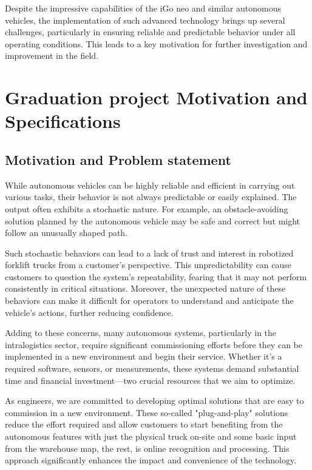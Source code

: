 Despite the impressive capabilities of the iGo neo and similar autonomous vehicles, the implementation 
of such advanced technology brings up several challenges, particularly in ensuring reliable and predictable 
behavior under all operating conditions. This leads to a key motivation for further investigation and improvement 
in the field.

\section{Graduation project Motivation and Specifications}

\subsection{Motivation and Problem statement}

While autonomous vehicles can be highly reliable and efficient in carrying out various 
tasks, their behavior is not always predictable or easily explained. The output often 
exhibits a stochastic nature. For example, an obstacle-avoiding solution planned by 
the autonomous vehicle may be safe and correct but might follow an unusually shaped path. 

Such stochastic behaviors can lead to a lack of trust and interest in robotized forklift 
trucks from a customer’s perspective. This unpredictability can cause customers to 
question the system's repeatability, fearing that it may not perform consistently in 
critical situations. Moreover, the unexpected nature of these behaviors can make it 
difficult for operators to understand and anticipate the vehicle's actions, further 
reducing confidence. 

Adding to these concerns, many autonomous systems, particularly in the intralogistics 
sector, require significant commissioning efforts before they can be implemented in 
a new environment and begin their service. Whether it's a required software, sensors, or 
measurements, these systems demand substantial time and financial investment—two 
crucial resources that we aim to optimize. 

As engineers, we are committed to developing optimal solutions that are easy to 
commission in a new environment. These so-called "plug-and-play" solutions reduce 
the effort required and allow customers to start benefiting from the autonomous 
features with just the physical truck on-site and some basic input from the 
warehouse map, the rest, is online recognition and processing. This approach 
significantly enhances the impact and convenience of the technology. 

